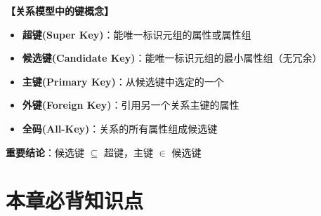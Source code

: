\documentclass[12pt, a4paper]{article}
\newenvironment{bluebox}[1]{%
  \begin{trivlist}
  \item[\hskip\labelsep \textbf{#1}]
  \setlength{\parskip}{0.5ex}
  \setlength{\itemsep}{0.5ex}
}{%
  \end{trivlist}
}
\begin{document}
\begin{bluebox}{键的概念}
	\textbf{【关系模型中的键概念】}

	\begin{itemize}
		\item \textbf{超键(Super Key)}：能唯一标识元组的属性或属性组
		\item \textbf{候选键(Candidate Key)}：能唯一标识元组的最小属性组（无冗余）
		\item \textbf{主键(Primary Key)}：从候选键中选定的一个
		\item \textbf{外键(Foreign Key)}：引用另一个关系主键的属性
		\item \textbf{全码(All-Key)}：关系的所有属性组成候选键
	\end{itemize}

	\textbf{重要结论}：候选键 $\subseteq$ 超键，主键 $\in$ 候选键
\end{bluebox}

\section{本章必背知识点}
\end{document}
